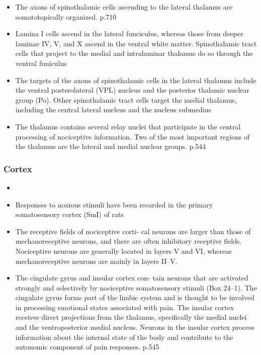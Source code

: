 \documentclass[12pt,a4paper,pdftex]{article}
\begin{document}
    
\begin{itemize}

    \item The axons of spinothalamic cells ascending to the lateral thalamus are somatotopically organized. \cite{paxinos2014rat} p.710
    \item Lamina I cells ascend in the lateral funciculus, whereas those from deeper laminae IV, V, and X ascend in the ventral white matter. Spinothalamic tract cells that project to the medial and intralaminar thalamus do so through the
    ventral funiculus
    \item The targets of the axons of spinothalamic cells in the lateral thalamus include the ventral posterolateral (VPL) nucleus and the posterior thalamic nuclear group (Po). Other spinothalamic tract cells target the medial thalamus, including the central lateral nucleus and the nucleus submedius \cite{paxinos2014rat}
    \item The thalamus contains several relay nuclei that participate in the central processing of nociceptive information. Two of the most important regions of the thalamus are the lateral and medial nuclear groups. \cite{kandel2013principles} p.544
\end{itemize}

\subsubsection*{Cortex}
\begin{itemize}
    \item 
    \item Responses to noxious stimuli have been recorded
    in the primary somatosensory cortex (SmI) of rats
    \cite{paxinos2014rat}
    \item The receptive fields of nociceptive corti-
    cal neurons are larger than those of mechanoreceptive
    neurons, and there are often inhibitory receptive fields.
    Nociceptive neurons are generally located in layers V and VI, whereas mechanoreceptive neurons are mainly
    in layers II–V. \cite{paxinos2014rat}
    \item The cingulate gyrus and insular cortex con-
    tain neurons that are activated strongly and selectively
    by nociceptive somatosensory stimuli (Box 24–1). The
    cingulate gyrus forms part of the limbic system and is
    thought to be involved in processing emotional states
    associated with pain. The insular cortex receives direct
    projections from the thalamus, specifically the medial nuclei and the ventroposterior medial nucleus. Neurons
    in the insular cortex process information about the
    internal state of the body and contribute to the autonomic component of pain responses. \cite{kandel2013principles} p.545
\end{itemize}
\end{document}
